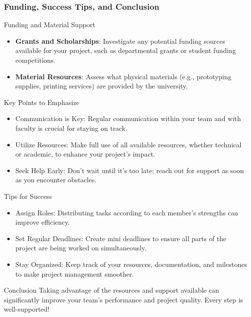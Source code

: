 \documentclass[aspectratio=169]{beamer}
\begin{document}
\begin{frame}[fragile]
  \frametitle{Funding, Success Tips, and Conclusion}
  \begin{block}{Funding and Material Support}
    \begin{itemize}
      \item \textbf{Grants and Scholarships}: Investigate any potential funding sources available for your project, such as departmental grants or student funding competitions.
      \item \textbf{Material Resources}: Assess what physical materials (e.g., prototyping supplies, printing services) are provided by the university.
    \end{itemize}
  \end{block}

  \begin{block}{Key Points to Emphasize}
    \begin{itemize}
      \item Communication is Key: Regular communication within your team and with faculty is crucial for staying on track.
      \item Utilize Resources: Make full use of all available resources, whether technical or academic, to enhance your project's impact.
      \item Seek Help Early: Don’t wait until it’s too late; reach out for support as soon as you encounter obstacles.
    \end{itemize}
  \end{block}

  \begin{block}{Tips for Success}
    \begin{itemize}
      \item Assign Roles: Distributing tasks according to each member's strengths can improve efficiency.
      \item Set Regular Deadlines: Create mini deadlines to ensure all parts of the project are being worked on simultaneously.
      \item Stay Organized: Keep track of your resources, documentation, and milestones to make project management smoother.
    \end{itemize}
  \end{block}

  \begin{block}{Conclusion}
    Taking advantage of the resources and support available can significantly improve your team's performance and project quality. Every step is well-supported!
  \end{block}
\end{frame}
\end{document}
